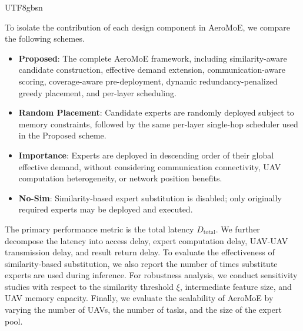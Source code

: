 \documentclass[journal]{IEEEtran}
\begin{document}
\begin{CJK*}{UTF8}{gbsn}

To isolate the contribution of each design component in AeroMoE, we compare the following schemes.

\begin{itemize}
    \item \textbf{Proposed}: The complete AeroMoE framework, including similarity-aware candidate construction, effective demand extension, communication-aware scoring, coverage-aware pre-deployment, dynamic redundancy-penalized greedy placement, and per-layer scheduling.
    \item \textbf{Random Placement}: Candidate experts are randomly deployed subject to memory constraints, followed by the same per-layer single-hop scheduler used in the Proposed scheme.
    \item \textbf{Importance}: Experts are deployed in descending order of their global effective demand, without considering communication connectivity, UAV computation heterogeneity, or network position benefits.
    \item \textbf{No-Sim}: Similarity-based expert substitution is disabled; only originally required experts may be deployed and executed.
\end{itemize}

The primary performance metric is the total latency \(D_{\mathrm{total}}\). We further decompose the latency into access delay, expert computation delay, UAV-UAV transmission delay, and result return delay. To evaluate the effectiveness of similarity-based substitution, we also report the number of times substitute experts are used during inference. For robustness analysis, we conduct sensitivity studies with respect to the similarity threshold \(\xi\), intermediate feature size, and UAV memory capacity. Finally, we evaluate the scalability of AeroMoE by varying the number of UAVs, the number of tasks, and the size of the expert pool.


\end{CJK*}
\end{document}
